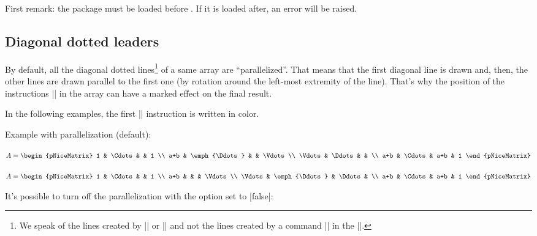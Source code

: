 \documentclass[dvipsnames]{article}
\begin{document}
First remark: the package  must be loaded before
. If it is loaded after, an error will be raised.

\subsection{Diagonal dotted leaders} 

\label{parallelization}

By default, all the diagonal dotted lines\footnote{We speak of the lines created by
|\Ddots| or |\Iddots| and not the lines created by a command |\line| in the |\CodeAfter|.} of a
same array are ``parallelized''. That means that the first diagonal line is
drawn and, then, the other lines are drawn parallel to the first one (by
rotation around the left-most extremity of the line). That's why the position
of the instructions |\Ddots| in the array can have a marked effect on the
final result.

\medskip
In the following examples, the first |\Ddots| instruction is written in color.


\smallskip
Example with parallelization (default):

\smallskip
\begin{Code}[width=9.5cm,show-output]
$A = \begin{pNiceMatrix}
  1      & \Cdots &        & 1      \\
  a+b    & \emph{\Ddots} &        & \Vdots \\
  \Vdots & \Ddots &        &        \\
  a+b    & \Cdots & a+b    & 1
\end{pNiceMatrix}$
\end{Code}

\bigskip
\begin{Code}[width=9.5cm,show-output]
$A = \begin{pNiceMatrix}
  1      & \Cdots &        & 1      \\
  a+b    &        &        & \Vdots \\
  \Vdots & \emph{\Ddots} & \Ddots &        \\
  a+b    & \Cdots & a+b    & 1
\end{pNiceMatrix}$
\end{Code}

\bigskip
It's possible to turn off the parallelization with the option
 set to |false|: 
\end{document}
